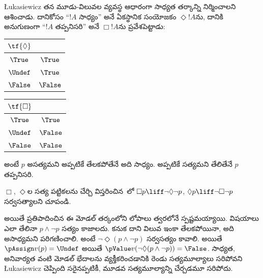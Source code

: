 \documentclass[../../../include/open-logic-section]{subfiles}
\begin{document}
\L ukasiewicz తన మూడు-విలువల వ్యవస్థ ఆధారంగా
సాధ్యత తర్కాన్ని నిర్మించాలని ఆశించాడు.
దానికోసం “$!A$ సాధ్యం” అనే ఏకస్థానిక
సంయోజకం $\Diamond !A$ను, దానికి అనుగుణంగా
“$!A$ తప్పనిసరి” అనే $\Box !A$ను
ప్రవేశపెట్టాడు:
\begin{center}
  \begin{tabular}{c|c}
    $\tf{\Diamond}$ & \\
    \hline
    $\True$ & $\True$ \\
    $\Undef$ & $\True$ \\
    $\False$ & $\False$
  \end{tabular}
  \quad
  \begin{tabular}{c|c}
    $\tf{\Box}$ & \\
    \hline
    $\True$ & $\True$ \\
    $\Undef$ & $\False$ \\
    $\False$ & $\False$
  \end{tabular}
\end{center}
అంటే $p$ అసత్యమని అప్పటికే తేలకపోతేనే అది సాధ్యం.
అప్పటికే సత్యమని తేలితేనే $p$ తప్పనిసరి.

\begin{prob}
  $\Box$, $\Diamond$ల సత్య పట్టికలను చేర్చి
విస్తరించిన~\LogLuk[3]లో
  $\Box p \liff \lnot\Diamond \lnot p$,
  $\Diamond p \liff
  \lnot \Box \lnot p$ సర్వసత్యాలని చూపండి.
\end{prob}

అయితే ప్రతిపాదించిన ఈ మోడల్ తర్కంలోని లోపాలు త్వరలోనే
స్పష్టమయ్యాయి. విషయాలు ఎలా తేలినా
$p \land \lnot p$ సత్యం కాజాలదు. కనుక దాని విలువ
ఇంకా తేలకపోయినా, అది అసాధ్యమని పరిగణించాలి.
అంటే $\lnot \Diamond(p
\land \lnot p)$ సర్వసత్యం కావాలి. అయితే
$\pAssign v(p) = \Undef$ అయితే
$\pValue v(\lnot \Diamond(p \land \lnot p)) =
\False$. సాధ్యత, అనివార్యత వంటి మోడల్
భేదాలను వ్యక్తీకరించడానికి రెండు సత్యమూల్యాలు
సరిపోవని \L ukasiewicz చెప్పింది సరైనప్పటికీ,
మూడవ సత్యమూల్యాన్ని చేర్చడమూ సరిపోదు.
\end{document}
